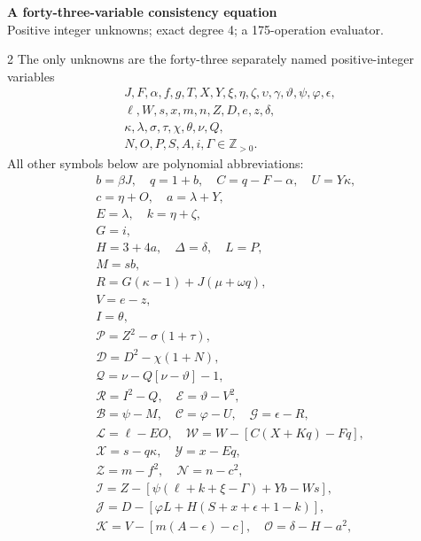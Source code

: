 \documentclass[10pt]{article}
\begin{document}
\begin{center}
{\large\bfseries A forty-three-variable consistency equation}\\[-1pt]
{\small Positive integer unknowns; exact degree 4; a 175-operation evaluator.}
\end{center}\vspace{-8pt}
\begin{multicols}{2}
\fontsize{8.6}{9.1}\selectfont
The only unknowns are the forty-three separately named positive-integer variables
\[
\begin{gathered}J,F,\alpha,f,g,T,X,Y,\xi,\eta,\zeta,\upsilon,\gamma,\vartheta,\psi,\varphi,\epsilon,\\
\ell,W,s,x,m,n,Z,D,e,z,\delta,\\
\kappa,\lambda,\sigma,\tau,\chi,\theta,\nu,Q,\\
N,O,P,S,A,i,\Gamma\in\mathbb Z_{>0}.\end{gathered}
\]
All other symbols below are polynomial abbreviations:
\[
\begin{gathered}
b=\beta J,\quad q=1+b,\quad C=q-F-\alpha,\quad U=Y\kappa,\\
c=\eta+O,\quad a=\lambda+Y,\\
E=\lambda,\quad k=\eta+\zeta,\\
G=i,\\
H=3+4a,\quad\Delta=\delta,\quad L=P,\\
M=sb,\\
R=G(\kappa-1)+J(\mu+\omega q),\\
V=e-z,\\
I=\theta,\\
\mathcal{P}=Z^2-\sigma(1+\tau),\\
\mathcal{D}=D^2-\chi(1+N),\\
\mathcal{Q}=\nu-Q[\nu-\vartheta]-1,\\
\mathcal{R}=I^2-Q,\quad \mathcal{E}=\vartheta-V^2,\\
\mathcal{B}=\psi-M,\quad \mathcal{C}=\varphi-U,\quad \mathcal{G}=\epsilon-R,\\
\mathcal{L}=\ell-EO,\quad \mathcal{W}=W-[C(X+Kq)-Fq],\\
\mathcal{X}=s-q\kappa,\quad \mathcal{Y}=x-Eq,\\
\mathcal{Z}=m-f^2,\quad \mathcal{N}=n-c^2,\\
\mathcal{I}=Z-[\psi(\ell+k+\xi-\Gamma)+Yb-Ws],\\
\mathcal{J}=D-[\varphi L+H(S+x+\epsilon+1-k)],\\
\mathcal{K}=V-[m(A-\epsilon)-c],\quad\mathcal{O}=\delta-H-a^2,\\

\end{gathered}\]
\end{multicols}
\end{document}
